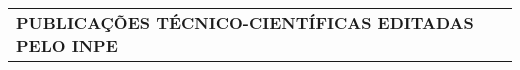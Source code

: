 
\thispagestyle{empty}
 \begin{table}
  \begin{center}
  \begin{tabularx}{\textwidth}{X}
   \textbf{PUBLICA\c{C}\~{O}ES T\'{E}CNICO-CIENT\'{I}FICAS EDITADAS PELO INPE}
  \end{tabularx} 
  \end{center}
 \end{table}
  
 \begin{table}
  \begin{center}
  \begin{tabularx}{\textwidth}{X X}
      

\end{tabularx}
\end{center}
\end{table}
